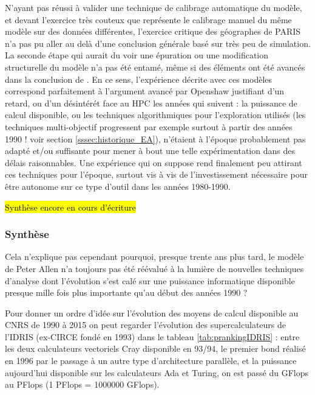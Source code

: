 N'ayant pas réussi à valider une technique de calibrage automatique du modèle, et devant l'exercice très couteux que représente le calibrage manuel du même modèle sur des données différentes, l'exercice critique des géographes de PARIS n'a pas pu aller au delà d'une conclusion générale basé sur très peu de simulation. La seconde étape qui aurait du voir une épuration ou une modification structurelle du modèle n'a pas été entamé, même si des éléments ont été avancés dans la conclusion de \textcite{Sanders1984}. En ce sens, l'expérience décrite avec ces modèles correspond parfaitement à l'argument avancé par Openshaw justifiant d'un retard, ou d'un désintérét face au HPC les années qui suivent : la puissance de calcul disponible, ou les techniques algorithmiques pour l'exploration utilisés (les techniques multi-objectif progressent par exemple surtout à partir des années 1990 ! voir section \ref{sssec:historique_EA}), n'étaient à l'époque probablement pas adapté et/ou suffisante pour mener à bout une telle expérimentation dans des délais raisonnables. Une expérience qui on suppose rend finalement peu attirant ces techniques pour l'époque, surtout vis à vis de l'investissement nécessaire pour être autonome sur ce type d'outil dans les années 1980-1990.

\hl{Synthèse encore en cours d'écriture}

\subsubsection{Synthèse}
\label{sssec:synthese}

Cela n'explique pas cependant pourquoi, presque trente ans plus tard, le modèle de Peter Allen n'a toujours pas été réévalué à la lumière de nouvelles techniques d'analyse dont l'évolution s'est calé sur une puissance informatique disponible presque mille fois plus importante qu'au début des années 1990 ?

Pour donner un ordre d'idée sur l'évolution des moyens de calcul disponible au CNRS de 1990 à 2015 on peut regarder l'évolution des supercalculateurs de l'IDRIS (ex-CIRCE fondé en 1993) dans le tableau \ref{tab:prankingIDRIS} : entre les deux calculateurs vectoriels Cray disponible en 93/94, le premier bond réalisé en 1996 par le passage à un autre type d'architecture parallèle, et la puissance aujourd'hui disponible sur les calculateurs Ada et Turing, on est passé du GFlops au PFlops (1 PFlops = 1000000 GFlops).

